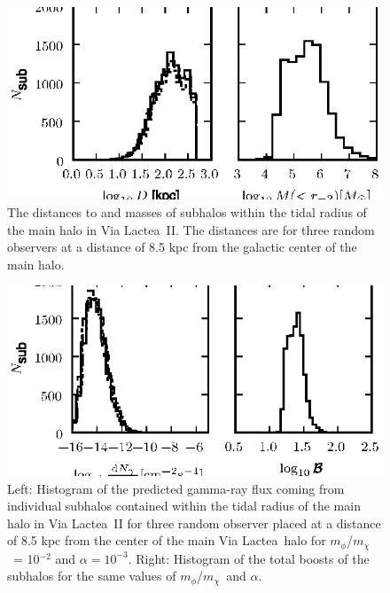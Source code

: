 \documentclass[aps,prd,twocolumn,amsmath,amssymb,floatfix,nofootinbib,10pt]{revtex4}
\newcommand{\VL}{Via Lactea}
\newcommand{\mdm}{\ensuremath{m_{\chi}}}
\newcommand{\mv}{\ensuremath{m_{\phi}}}
\begin{document}
\begin{figure}
\centering
\includegraphics{hist_-2_-3_10_1.eps}
\caption{The distances to and masses of subhalos within the tidal
radius of the main halo in \VL\ II. The distances are for three random
observers at a distance of 8.5 kpc from the galactic center of the
main halo.}%
\label{fig:VL23_1}%
\end{figure}






\begin{figure}
\centering
\includegraphics{hist_-2_-3_10_2.eps}
\caption{Left: Histogram of the predicted gamma-ray flux coming from
individual subhalos contained within the tidal radius of the main halo
in \VL\ II for three random observer placed at a distance of 8.5 kpc
from the center of the main \VL\ halo for \mv/\mdm\ = 10$^{-2}$ and
$\alpha = 10^{-3}$. Right: Histogram of the total boosts of the
subhalos for the same values of \mv/\mdm\ and $\alpha$.}%
\label{fig:VL23_2}%
\end{figure}
\end{document}

